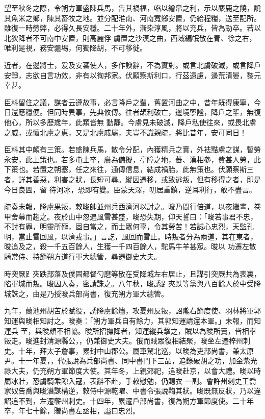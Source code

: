 \begin{pinyinscope}
 望至秋冬之際，令朔方軍盛陳兵馬，告其禍福，啗以繒帛之利，示以麋鹿之饒，說其魚米之鄉，陳其畜牧之地。並分配淮南、河南寬鄉安置，仍給程糧，送至配所。雖復一時勞弊，必得久長安穩。二十年外，漸染淳風，將以充兵，皆為勁卒。若以北狄降者不可南中安置，則高麗俘
 虜置之沙漠之曲，西域編氓散在青、徐之右，唯利是視，務安疆埸，何獨降胡，不可移徙。



 近者，在邊將士，爰及安蕃使人，多作諛辭，不為實對。或言北虜破滅，或言降戶安靜，志欲自言功效，非有以徇邦家。伏願察斯利口，行茲遠慮，邊荒清晏，黎元幸甚。



 臣料留住之議，謀者云遵故事，必言降戶之輩，舊置河曲之中，昔年既得康寧，今日還應穩便。但同時異事，先典攸傳。往者頡利破亡，邊境寧謐，降戶之輩，無復他心，所以多歷歲年，此類皆無
 動靜。今虜見未破滅，降戶私使往來，或畏北虜之威，或懷北虜之惠，又是北虜戚屬，夫豈不識親疏，將比昔年，安可同日！



 臣料其中頗有三策。若盛陳兵馬，散令分配，內獲精兵之實，外袪黠虜之謀，暫勞永安，此上策也。若多屯士卒，廣為備擬，亭障之地，蕃、漢相參，費甚人勞，此下策也。若置之朔塞，任之來往，通傳信息，結成禍胎，此無策也。伏願察斯三者，詳其善惡，利害之狀，長短可尋。縱因遷移，或致逃叛，但有移得之者，即是今日良圖，留
 待河冰，恐即有變。臣蒙天澤，叨居重鎮，逆耳利行，敢不盡言。



 疏奏未報，降虜果叛，敕晙帥並州兵西濟河以討之。晙乃間行倍道，以夜繼晝，卷甲舍幕而趨之。夜於山中忽遇風雪甚盛，晙恐失期，仰天誓曰：「晙若事君不忠，不討有罪，明靈所殛，固自當之，而士眾何辜，令其勞苦！若誠心忠烈，天監孔明，當止雪回風，以濟戎事。」言訖，風回而雪止。時叛者分為兩道，其在東者，晙追及之，殺一千五百餘人，生獲一千四百餘人，駝馬牛羊甚眾。晙以
 功遷左散騎常侍、持節朔方道行軍大總管，尋遷御史大夫。



 時突厥𧾷夾跌部落及僕固都督勺磨等散在受降城左右居止，且謀引突厥共為表裏，陷軍城而叛。晙因入奏，密請誅之。八年秋，晙誘𧾷夾跌等黨與八百餘人於中受降城誅之，由是乃授晙兵部尚書，復充朔方軍大總管。



 九年，蘭池州胡苦於賦役，誘降虜餘燼，攻夏州反叛，詔隴右節度使、羽林將軍郭知運與晙相知討之。晙奏：「朔方軍兵自有餘力，其郭知運請還本軍。」未報，而知運兵
 至，與晙頗不相協。晙所招撫降者，知運縱兵擊之，賊以為晙所賣，皆相率叛走。晙進封清源縣公，，仍兼御史大夫。俄而賊眾復相結聚，晙坐左遷梓州刺史。十年，拜太子詹事，累封中山郡公。屬車駕北巡，以晙為吏部尚書，兼太原尹。十一年夏，，代張說為兵部尚書、同中書門下三品，追錄破胡之功，加金紫光祿大夫，仍充朔方軍節度大使。其年冬，上親郊祀，追晙赴京，以會大禮。晙以時屬冰壯，恐虜騎乘隙入寇，表辭不赴，手敕慰勉，仍賜衣
 一副。會許州刺史王喬家奴告喬與晙潛謀構逆，敕侍中源乾曜、中書令張說鞫其狀。晙既無反狀，乃以違詔追不到，左遷蘄州刺史。十四年，累遷戶部尚書，復為朔方軍節度使。二十年卒，年七十餘，贈尚書左丞相，謚曰忠烈。




\end{pinyinscope}
